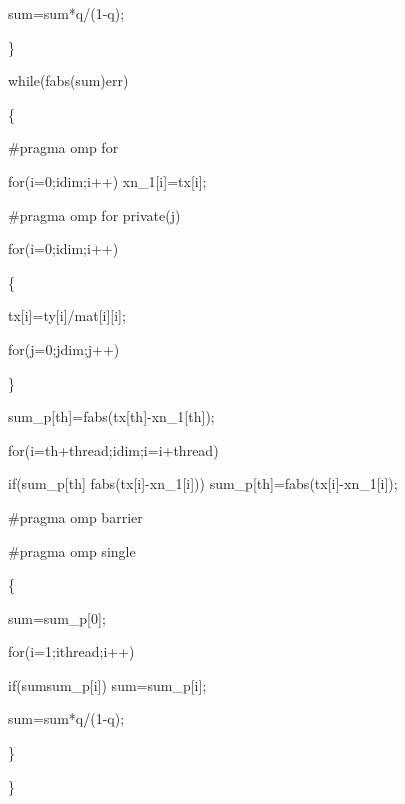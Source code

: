 \documentclass[a4paper]{article}
\begin{document}
\qquad \qquad {}

{\small \qquad \qquad \qquad sum=sum*q/(1-q);}

{\small \qquad \qquad \}}

{\small \qquad \qquad while(fabs(sum)\TEXTsymbol{>}err)}

{\small \qquad \qquad \{\qquad }

{\small \qquad \qquad \qquad \#pragma omp for}

{\small \qquad \qquad \qquad \qquad for(i=0;i\TEXTsymbol{<}dim;i++)
xn\_1[i]=tx[i];}

{\small \qquad \qquad \qquad \#pragma omp for private(j)}

{\small \qquad \qquad \qquad \qquad for(i=0;i\TEXTsymbol{<}dim;i++)}

{\small \qquad \qquad \qquad \qquad \{}

{\small \qquad \qquad \qquad \qquad \qquad tx[i]=ty[i]/mat[i][i];}

{\small \qquad \qquad \qquad \qquad \qquad for(j=0;j\TEXTsymbol{<}dim;j++)}

\qquad \qquad \qquad \qquad {}

{\small \qquad \qquad \qquad \qquad \}}

{\small \qquad \qquad \qquad sum\_p[th]=fabs(tx[th]-xn\_1[th]);}

{\small \qquad \qquad \qquad for(i=th+thread;i\TEXTsymbol{<}dim;i=i+thread)}

{\small \qquad \qquad \qquad \qquad if(sum\_p[th]\TEXTsymbol{<}%
fabs(tx[i]-xn\_1[i])) sum\_p[th]=fabs(tx[i]-xn\_1[i]);}

{\small \qquad \qquad \qquad \#pragma omp barrier}

{\small \qquad \qquad \qquad \#pragma omp single}

{\small \qquad \qquad \qquad \{}

{\small \qquad \qquad \qquad \qquad sum=sum\_p[0];}

{\small \qquad \qquad \qquad \qquad for(i=1;i\TEXTsymbol{<}thread;i++)}

{\small \qquad \qquad \qquad \qquad \qquad if(sum\TEXTsymbol{<}sum\_p[i])
sum=sum\_p[i];}

{\small \qquad \qquad \qquad \qquad sum=sum*q/(1-q);}

{\small \qquad \qquad \qquad \}}

{\small \qquad \qquad \}}
\end{document}
